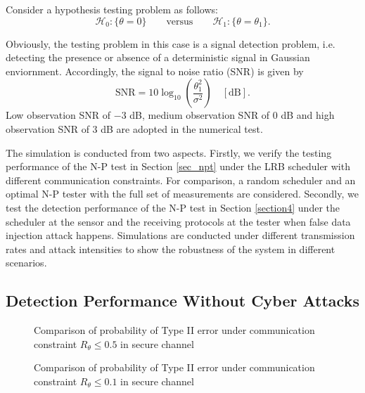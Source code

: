 \documentclass[journal]{IEEEtran}
\def\cH{\mathcal{H}}
\begin{document}
Consider a hypothesis testing problem as follows:
\begin{equation}
\cH_{0}:\{\theta=0\}\quad\quad  \text{versus} \quad\quad \cH_{1}:\{\theta=\theta_{1}\}.
\end{equation}

Obviously, the testing problem in this case is a signal detection problem, i.e. detecting the presence or absence of a deterministic signal in Gaussian enviornment. Accordingly, the signal to noise ratio (SNR) is given by
\begin{equation}
\text{SNR}=10\log_{10}\left( \frac{\theta_{1}^{2}}{\sigma^2}\right)\quad[\text{dB}].
\end{equation}
Low observation SNR of $-3$ dB,  medium observation SNR of $0$ dB and high observation SNR of $3$ dB are adopted in the numerical test.

The simulation is conducted from two aspects. Firstly, we verify the testing performance of the N-P test in Section \ref{sec_npt} under  the LRB scheduler with different communication constraints. For comparison, a random scheduler and an optimal N-P tester with the full set of measurements are considered. Secondly, we test the detection performance of the N-P test in Section \ref{section4} under the scheduler at the sensor and the  receiving protocols at the tester when false data injection attack happens.  Simulations are conducted under different transmission rates and attack intensities to show the robustness of the system in different scenarios.

\subsection{Detection Performance Without Cyber Attacks}

\begin{figure*}[htbp!]
\centering
{}
\caption{ Comparison of probability of Type II error under communication constraint $R_{\theta}\leqslant0.5$ in secure channel}
\label{NPsimulation1}
\end{figure*}

\begin{figure*}[htbp!]
\centering
{}
\caption{ Comparison of probability of Type II error under communication constraint $R_{\theta}\leqslant0.1$ in secure channel}
\label{NPsimulation2}
\end{figure*}
\end{document}
